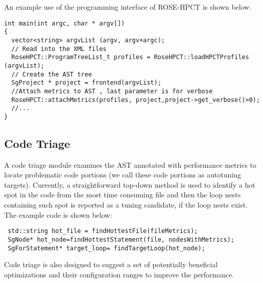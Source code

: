 An example use of the programming interface of ROSE-HPCT is shown below.

{\mySmallFontSize
\begin{verbatim}
int main(int argc, char * argv[]) 
{
  vector<string> argvList (argv, argv+argc);
  // Read into the XML files
  RoseHPCT::ProgramTreeList_t profiles = RoseHPCT::loadHPCTProfiles (argvList);
  // Create the AST tree
  SgProject * project = frontend(argvList);
  //Attach metrics to AST , last parameter is for verbose
  RoseHPCT::attachMetrics(profiles, project,project->get_verbose()>0);
  //...
}
\end{verbatim}
}

\subsection{Code Triage}
A code triage module examines the AST annotated with
performance metrics to locate problematic code portions (we call these code portions
as autotuning targets).
Currently, a straightforward top-down method is used to identify a hot spot
in the code from the most time consuming file and then the loop nests containing such spot is reported as a
tuning candidate, if the loop nests exist. The example code is shown below:

{\mySmallFontSize
\begin{verbatim}
 std::string hot_file = findHottestFile(fileMetrics);
 SgNode* hot_node=findHottestStatement(file, nodesWithMetrics);
 SgForStatement* target_loop= findTargetLoop(hot_node);

\end{verbatim}
}

Code triage is also designed to suggest a set of potentially beneficial optimizations and
their configuration ranges to improve the performance.


